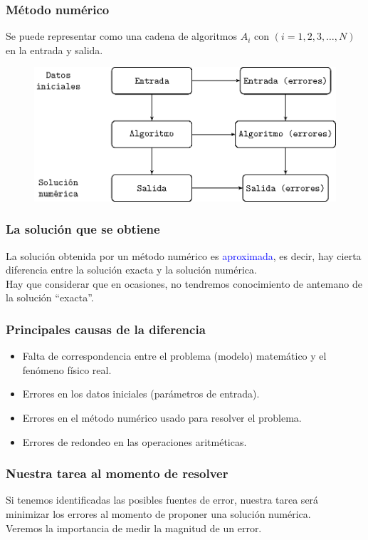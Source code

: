 \documentclass[12pt]{beamer}
\begin{document}
\begin{frame}
\frametitle{Método numérico}
Se puede representar como una cadena de algoritmos $A_{i}$ con $(i = 1, 2, 3, \ldots , N)$ en la entrada y salida.
\\
\bigskip
\pause
\begin{figure}
\centering
\includegraphics[scale=0.7]{Imagenes/dibujometodonum.eps} 
\end{figure}
\end{frame}
\begin{frame}
\frametitle{La solución que se obtiene}
La solución obtenida por un método numérico es \textcolor{blue}{aproximada}, es decir, hay cierta diferencia entre la solución exacta y la solución numérica.
\\
\bigskip
\pause
Hay que considerar que en ocasiones, no tendremos conocimiento de antemano de la solución \enquote{exacta}.
\end{frame}
\begin{frame}
\frametitle{Principales causas de la diferencia}
\begin{itemize}[<+->]
\item[\ding{217}] Falta de correspondencia entre el problema (modelo) matemático y el fenómeno físico real.
\item[\ding{217}] Errores en los datos iniciales (parámetros de entrada).
\item[\ding{217}] Errores en el método numérico usado para resolver el problema.
\item[\ding{217}] Errores de redondeo en las operaciones aritméticas.
\end{itemize}
\end{frame}
\begin{frame}[fragile]
\frametitle{Nuestra tarea al momento de resolver}
Si tenemos identificadas las posibles fuentes de error, nuestra tarea será minimizar los errores al momento de proponer una solución numérica.
\\
\bigskip
\pause
Veremos la importancia de medir la magnitud de un error.
\end{frame}
\end{document}
